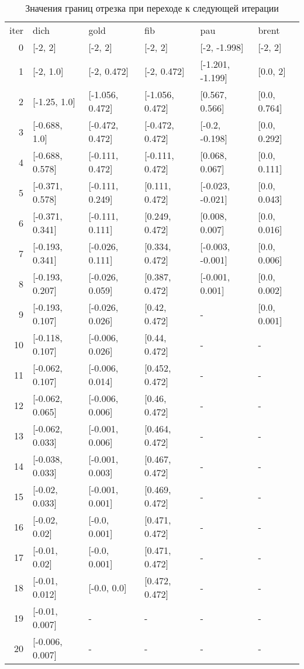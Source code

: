 \documentclass[fleqn]{article}
\begin{document}
\begin{table}[p]
    \centering
    \caption{Значения границ отрезка при переходе к следующей итерации}
    \begin{tabular}{rlllll}
iter & dich & gold & fib & pau & brent \\
0 & [-2, 2] & [-2, 2] & [-2, 2] & [-2, -1.998] & [-2, 2] \\
1 & [-2, 1.0] & [-2, 0.472] & [-2, 0.472] & [-1.201, -1.199] & [0.0, 2] \\
2 & [-1.25, 1.0] & [-1.056, 0.472] & [-1.056, 0.472] & [0.567, 0.566] & [0.0, 0.764] \\
3 & [-0.688, 1.0] & [-0.472, 0.472] & [-0.472, 0.472] & [-0.2, -0.198] & [0.0, 0.292] \\
4 & [-0.688, 0.578] & [-0.111, 0.472] & [-0.111, 0.472] & [0.068, 0.067] & [0.0, 0.111] \\
5 & [-0.371, 0.578] & [-0.111, 0.249] & [0.111, 0.472] & [-0.023, -0.021] & [0.0, 0.043] \\
6 & [-0.371, 0.341] & [-0.111, 0.111] & [0.249, 0.472] & [0.008, 0.007] & [0.0, 0.016] \\
7 & [-0.193, 0.341] & [-0.026, 0.111] & [0.334, 0.472] & [-0.003, -0.001] & [0.0, 0.006] \\
8 & [-0.193, 0.207] & [-0.026, 0.059] & [0.387, 0.472] & [-0.001, 0.001] & [0.0, 0.002] \\
9 & [-0.193, 0.107] & [-0.026, 0.026] & [0.42, 0.472] & - & [0.0, 0.001] \\
10 & [-0.118, 0.107] & [-0.006, 0.026] & [0.44, 0.472] & - & - \\
11 & [-0.062, 0.107] & [-0.006, 0.014] & [0.452, 0.472] & - & - \\
12 & [-0.062, 0.065] & [-0.006, 0.006] & [0.46, 0.472] & - & - \\
13 & [-0.062, 0.033] & [-0.001, 0.006] & [0.464, 0.472] & - & - \\
14 & [-0.038, 0.033] & [-0.001, 0.003] & [0.467, 0.472] & - & - \\
15 & [-0.02, 0.033] & [-0.001, 0.001] & [0.469, 0.472] & - & - \\
16 & [-0.02, 0.02] & [-0.0, 0.001] & [0.471, 0.472] & - & - \\
17 & [-0.01, 0.02] & [-0.0, 0.001] & [0.471, 0.472] & - & - \\
18 & [-0.01, 0.012] & [-0.0, 0.0] & [0.472, 0.472] & - & - \\
19 & [-0.01, 0.007] & - & - & - & - \\
20 & [-0.006, 0.007] & - & - & - & - \\

\end{tabular}
\end{table}
\end{document}
